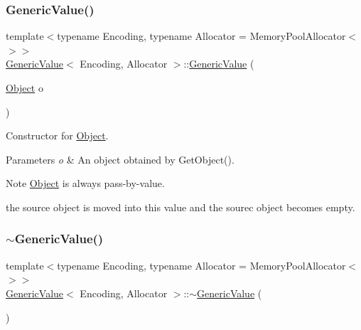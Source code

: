 \subsubsection{\texorpdfstring{Generic\+Value()}{GenericValue()}\hspace{0.1cm}{\footnotesize\ttfamily [8/8]}}
{\footnotesize\ttfamily template$<$typename Encoding, typename Allocator = Memory\+Pool\+Allocator$<$$>$$>$ \\
\hyperlink{classGenericValue}{Generic\+Value}$<$ Encoding, Allocator $>$\+::\hyperlink{classGenericValue}{Generic\+Value} (\begin{DoxyParamCaption}\item[{\hyperlink{structGenericValue_1_1Object}{Object}}]{o }\end{DoxyParamCaption})\hspace{0.3cm}{\ttfamily [inline]}}



Constructor for \hyperlink{structGenericValue_1_1Object}{Object}. 


\begin{DoxyParams}{Parameters}
{\em o} & An object obtained by {\ttfamily Get\+Object()}. \\
\hline
\end{DoxyParams}
\begin{DoxyNote}{Note}
{\ttfamily \hyperlink{structGenericValue_1_1Object}{Object}} is always pass-\/by-\/value. 

the source object is moved into this value and the sourec object becomes empty. 
\end{DoxyNote}
\mbox{\label{classGenericValue_a213ba89ef5ef961a5e655bd8c78ac9f4}} 
\subsubsection{\texorpdfstring{$\sim$\+Generic\+Value()}{~GenericValue()}\hspace{0.1cm}{\footnotesize\ttfamily [2/2]}}
{\footnotesize\ttfamily template$<$typename Encoding, typename Allocator = Memory\+Pool\+Allocator$<$$>$$>$ \\
\hyperlink{classGenericValue}{Generic\+Value}$<$ Encoding, Allocator $>$\+::$\sim$\hyperlink{classGenericValue}{Generic\+Value} (\begin{DoxyParamCaption}{ }\end{DoxyParamCaption})\hspace{0.3cm}{\ttfamily [inline]}}



